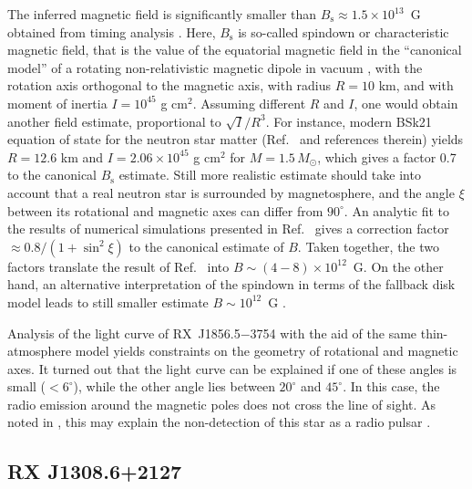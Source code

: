 \documentclass{pos1}
\begin{document}
The inferred magnetic field is significantly smaller than
$B_\mathrm{s}\approx1.5\times10^{13}$~G obtained from timing analysis
\cite{vKK08}. Here, $B_\mathrm{s}$ is so-called spindown or
characteristic magnetic field, that is the value of the equatorial
magnetic field in the ``canonical model'' of a rotating
non-relativistic magnetic dipole in vacuum \cite{Deutsch55}, with the
rotation axis orthogonal to the magnetic axis, with radius $R=10$ km,
and with moment of inertia $I=10^{45}$ g cm$^2$. Assuming different
$R$ and $I$, one would obtain another field estimate, proportional to
$\sqrt{I}/R^3$. For instance, modern BSk21 equation of state for the
neutron star matter (Ref.~\cite{Potekhin_ea13} and references therein)
yields $R=12.6$ km and $I=2.06\times10^{45}$ g cm$^2$ for
$M=1.5\,M_\odot$, which gives a factor 0.7 to the canonical
$B_\mathrm{s}$ estimate. Still more realistic estimate should take
into account that a real neutron star is surrounded by magnetosphere,
and the angle $\xi$ between its rotational and magnetic axes can
differ from $90^\circ$. An analytic fit to the results of numerical
simulations presented in Ref.~\cite{Spitkovsky06} gives a correction
factor $\approx0.8/(1+\sin^2\xi)$ to the canonical estimate of $B$.
Taken together, the two factors translate the result of
Ref.~\cite{vKK08} into $B\sim(4-8)\times10^{12}$~G. On the other
hand, an alternative interpretation of the spindown in terms of the
fallback disk model leads to still smaller estimate $B\sim10^{12}$~G
\cite{Ertan_ea14}.

Analysis \cite{Ho07} of the light curve of RX~J1856.5$-$3754 with the
aid of the same thin-atmosphere model yields constraints on the
geometry of rotational and magnetic axes. It turned out that the light
curve can be explained if one of these angles is small ($<6^\circ$),
while the other angle lies between  $20^\circ$ and $45^\circ$. In this
case, the radio emission around the magnetic poles does not cross the
line of sight. As noted in \cite{Ho07}, this may explain the
non-detection of this star as a radio pulsar \cite{Kondratiev_ea09}.

\subsection{RX J1308.6+2127}
\label{sect:RBS1223}
\end{document}
